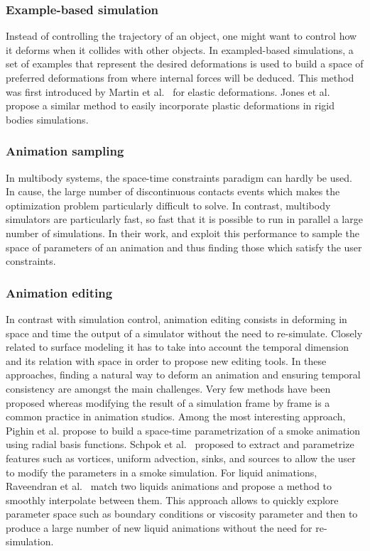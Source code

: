 \subsubsection{Example-based simulation}
Instead of controlling the trajectory of an object, one might want to control how it deforms when it collides with other objects. 
In exampled-based simulations, a set of examples that represent the desired deformations is used to build a space of preferred deformations from where internal forces will be deduced. This method was first introduced by Martin et al.~\cite{Martin2011} for elastic deformations. Jones et al.\cite{Jones2016} propose a similar method to easily incorporate plastic deformations in rigid bodies simulations.

\subsubsection{Animation sampling}
In multibody systems, the space-time constraints paradigm can hardly be used. In cause, the large number of discontinuous contacts events which makes the optimization problem particularly difficult to solve. In contrast, multibody simulators are particularly fast, so fast that it is possible to run in parallel a large number of simulations. In their work, \cite{Chenney2000} and \cite{Twigg2007} exploit this performance to sample the space of parameters of an animation and thus finding those which satisfy the user constraints.

\subsubsection{Animation editing} 
In contrast with simulation control, animation editing consists in deforming in space and time the output of a simulator without the need to re-simulate. 
Closely related to surface modeling it has to take into account the temporal dimension and its relation with space in order to propose new editing tools. 
In these approaches, finding a natural way to deform an animation and ensuring temporal consistency are amongst the main challenges.
Very few methods have been proposed whereas modifying the result of a simulation frame by frame is a common practice in animation studios. 
Among the most interesting approach, Pighin et al.\cite{Pighin2004} propose to build a space-time parametrization of a smoke animation using radial basis functions. 
Schpok et al.~\cite{Schpok2005} proposed to extract and parametrize features such as vortices, uniform advection, sinks, and sources to allow the user to modify the parameters in a smoke simulation.
For liquid animations, Raveendran et al.~\cite{Raveendran2014} match two liquids animations and propose a method to smoothly interpolate between them. 
This approach allows to quickly explore parameter space such as boundary conditions or viscosity parameter and then to produce a large number of new liquid animations without the need for re-simulation.

